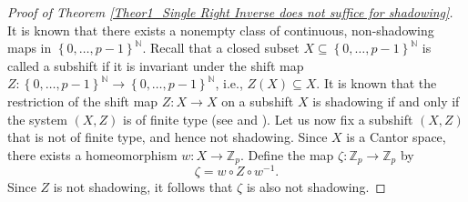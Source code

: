 \documentclass[a4paper, 12pt]{article}
\theoremstyle{definition}
\begin{document}
\begin{proof}[Proof of Theorem \ref{Theor1_Single Right Inverse does not suffice for shadowing}]
		
		It is known that there exists a nonempty class of continuous, non-shadowing maps in $ \left\{  0, \dots, p-1  \right\} ^{\mathbb{N} }$. 
		Recall that a closed subset $ X \subseteq  \left\{  0, \dots, p-1  \right\} ^{\mathbb{N} }$ is called a subshift if it is invariant under the shift map $ Z:  \left\{  0, \dots, p-1  \right\} ^{\mathbb{N} } \to  \left\{  0, \dots, p-1  \right\} ^{ \mathbb{N} }$, i.e., $Z \left(  X  \right)  \subseteq X$. 
		It is known that the restriction of the shift map $Z: X \to X$ on a subshift $X$ is shadowing if and only if the system $ \left(  X, Z  \right) $ is of finite type (see \cite[Chapter 15, Section 4]{Aoki-Topological_Dynamics} and \cite[Theorem 1]{Walters_On_the_Pseudo_Orbit_Tracing_Property_and_its_relationship_to_Stability}). 
		Let us now fix a subshift $ \left(  X, Z  \right) $ that is not of finite type, and hence not shadowing. Since $X$ is a Cantor space, 
		there exists a homeomorphism $w: X \to \mathbb{Z}_{p}$. 
		Define the map $\zeta: \mathbb{Z}_{p} \to \mathbb{Z}_{p}$ by 
		\begin{equation}\label{Eq_Theor1_SRI Non Shadowing Map}   
			\zeta  = w \circ Z \circ w^{-1}.
		\end{equation} 
		Since $Z$ is not shadowing, it follows that $\zeta$ is also not shadowing. 
		

\end{proof}
\end{document}
